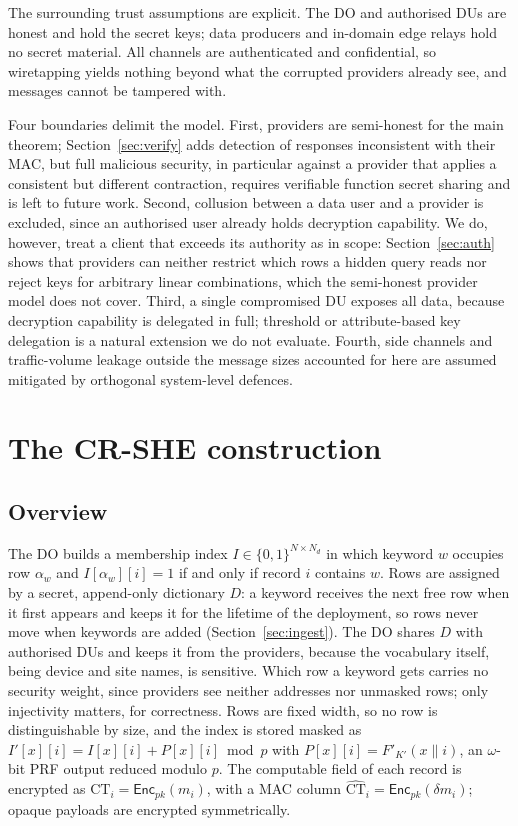 \documentclass[a4paper,fleqn]{cas-dc}
\newcommand{\Enc}{\mathsf{Enc}}
\begin{document}
The surrounding trust assumptions are explicit. The DO and authorised DUs are
honest and hold the secret keys; data producers and in-domain edge relays hold
no secret material. All channels are authenticated and confidential, so
wiretapping yields nothing beyond what the corrupted providers already see,
and messages cannot be tampered with.

Four boundaries delimit the model. First, providers are semi-honest for the
main theorem; Section~\ref{sec:verify} adds detection of responses
inconsistent with their MAC, but full malicious security, in particular
against a provider that applies a consistent but different contraction,
requires verifiable function secret sharing and is left to future work.
Second, collusion between a data user and a provider is excluded, since an
authorised user already holds decryption capability. We do, however, treat a
client that exceeds its authority as in scope: Section~\ref{sec:auth} shows
that providers can neither restrict which rows a hidden query reads nor reject
keys for arbitrary linear combinations, which the semi-honest provider model
does not cover. Third, a single compromised DU exposes all data, because
decryption capability is delegated in full; threshold or attribute-based key
delegation is a natural extension we do not evaluate. Fourth, side channels
and traffic-volume leakage outside the message sizes accounted for here are
assumed mitigated by orthogonal system-level defences.

\section{The CR-SHE construction}
\label{sec:construction}

\subsection{Overview}
The DO builds a membership index $I\in\{0,1\}^{N\times N_d}$ in which keyword
$w$ occupies row $\alpha_w$ and $I[\alpha_w][i]=1$ if and only if record $i$
contains $w$. Rows are assigned by a secret, append-only dictionary $D$: a
keyword receives the next free row when it first appears and keeps it for the
lifetime of the deployment, so rows never move when keywords are added
(Section~\ref{sec:ingest}). The DO shares $D$ with authorised DUs and keeps it
from the providers, because the vocabulary itself, being device and site
names, is sensitive. Which row a keyword gets carries no security weight,
since providers see neither addresses nor unmasked rows; only injectivity
matters, for correctness. Rows are fixed width, so no row is distinguishable
by size, and the index is stored masked as $I'[x][i]=I[x][i]+P[x][i]\bmod p$
with $P[x][i]=F'_{K'}(x\|i)$, an $\omega$-bit PRF output reduced modulo $p$.
The computable field of each record is encrypted as
$\text{CT}_i=\Enc_{pk}(m_i)$, with a MAC column
$\widehat{\text{CT}}_i=\Enc_{pk}(\delta m_i)$; opaque payloads are encrypted
symmetrically.
\end{document}
